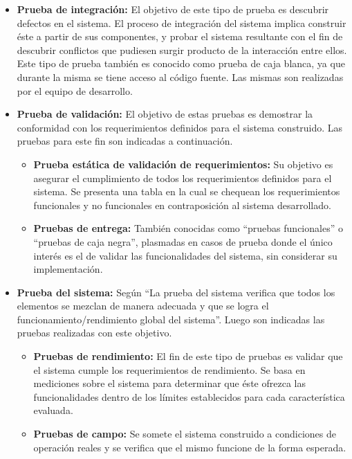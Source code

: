 \begin{itemize}
    \item{\textbf{Prueba de integración:}} El objetivo de este tipo de prueba es descubrir defectos en el sistema. El proceso de integración del sistema implica construir éste a partir de sus componentes, y probar el sistema resultante con el fin de descubrir conflictos que pudiesen surgir producto de la interacción entre ellos. Este tipo de prueba también es conocido como prueba de caja blanca, ya que durante la misma se tiene acceso al código fuente. Las mismas son realizadas por el equipo de desarrollo.
    
    \item{\textbf{Prueba de validación:}} El objetivo de estas pruebas es demostrar la conformidad con los requerimientos definidos para el sistema construido. Las pruebas para este fin son indicadas a continuación. 
    
        \begin{itemize}
            \item{\textbf{Prueba estática de validación de requerimientos:}} Su objetivo es asegurar el cumplimiento de todos los requerimientos definidos para el sistema. Se presenta una tabla en la cual se chequean los requerimientos funcionales y no funcionales en contraposición al sistema desarrollado.
            \item{\textbf{Pruebas de entrega:}} También conocidas como “pruebas funcionales” o “pruebas de caja negra”, plasmadas en casos de prueba donde el único interés es el de validar las funcionalidades del sistema, sin considerar su implementación.
        \end{itemize}
        
    \item{\textbf{Prueba del sistema:}} Según \cite{Press10} ``La prueba del sistema verifica que todos los elementos se mezclan de manera adecuada y que se logra el funcionamiento/rendimiento global del sistema''. Luego son indicadas las pruebas realizadas con este objetivo.
        \begin{itemize}
            \item{\textbf{Pruebas de rendimiento:}} El fin de este tipo de pruebas es validar que el sistema cumple los requerimientos de rendimiento. Se basa en mediciones sobre el sistema para determinar que éste ofrezca las funcionalidades dentro de los límites establecidos para cada característica evaluada.
            \item{\textbf{Pruebas de campo:}} Se somete el sistema construido a condiciones de operación reales y se verifica que el mismo funcione de la forma esperada.
        \end{itemize}
\end{itemize}

